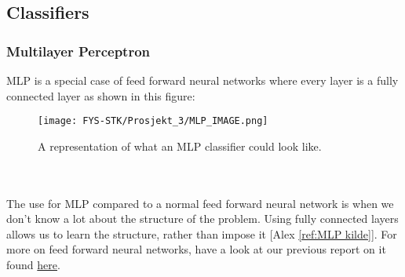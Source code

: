 \documentclass[english,notitlepage,reprint,nofootinbib]{revtex4-1}  %
\begin{document}
\subsection{Classifiers}
\subsubsection{Multilayer Perceptron}
MLP is a special case of feed forward neural networks where every layer is a fully connected layer as shown in this figure:

\begin{figure}[H]
    \centering
    \texttt{[image: FYS-STK/Prosjekt\_3/MLP\_IMAGE.png]}
    \caption{A representation of what an MLP classifier could look like.}
    \label{fig: 1}
\end{figure}
\\
\\
The use for MLP compared to a normal feed forward neural network is when we don't know a lot about the structure of the problem. Using fully connected layers allows us to learn the structure, rather than impose it [Alex \ref{ref:MLP kilde}]. 
For more on feed forward neural networks, have a look at our previous report on it found \href{https://github.com/erlend1202/FYS_STK4155_Prosjekt_2}{here}.


\end{document}
